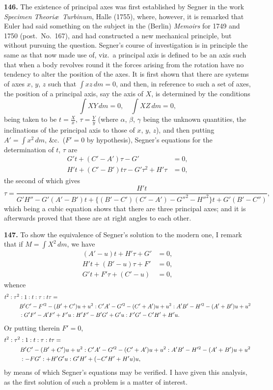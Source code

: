 \documentclass[11pt,a4paper]{book}
\begin{document}
\textbf{146.} The existence of principal axes was first established by Segner in the work \textit{Specimen Theori\ae\ Turbinum}, Halle (1755), where, however, it is remarked that Euler had said something on the subject in the (Berlin) \textit{Memoirs} for 1749 and 1750 (post.\ No.\ 167), and had constructed a new mechanical principle, but without pursuing the question. Segner's course of investigation is in principle the same as that now made use of, viz.\ a principal axis is defined to be an axis such that when a body revolves round it the forces arising from the rotation have no tendency to alter the position of the axes. It is first shown that there are systems of axes $x$, $y$, $z$ such that $\int xz\,dm = 0$, and then, in reference to such a set of axes, the position of a principal axis, say the axis of $X$, is determined by the conditions
\[
\int XY\,dm = 0, \quad \int XZ\,dm = 0,
\]
being taken to be $t = \frac{X}{x}$, $\tau = \frac{Y}{y}$ (where $\alpha$, $\beta$, $\gamma$ being the unknown quantities, the inclinations of the principal axis to those of $x$, $y$, $z$), and then putting $A' = \int x^2\,dm$, \&c.\ ($F' = 0$ by hypothesis), Segner's equations for the determination of $t$, $\tau$ are
\begin{align*}
G't + (C' - A')\tau - G' &= 0, \\
H't + (C' - B')t\tau - G'\tau^2 + H'\tau &= 0,
\end{align*}
the second of which gives
\[
\tau = \frac{H't}{G'H'' - G'(A' - B')t + \{(B' - C')(C' - A') - G''^2 - H''^2\}t + G'(B' - C'')},
\]
which being a cubic equation shows that there are three principal axes; and it is afterwards proved that these are at right angles to each other.

\textbf{147.} To show the equivalence of Segner's solution to the modern one, I remark that if $M = \int X^2\,dm$, we have
\begin{align*}
(A' - u)t + H'\tau + G' &= 0, \\
H't + (B' - u)\tau + F' &= 0, \\
G't + F'\tau + (C' - u) &= 0,
\end{align*}
whence
\begin{align*}
t^2 : \tau^2 : 1 : t : \tau : t\tau &= \\
&\hspace{-2cm} B'C' - F'^2 - (B' + C')u + u^2 : C'A' - G'^2 - (C' + A')u + u^2 : A'B' - H'^2 - (A' + B')u + u^2 \\
&\hspace{-2cm} : G'F' - A'F' + F'u : H'F' - B'G' + G'u : F'G' - C'H' + H'u.
\end{align*}
Or putting therein $F' = 0$,
\begin{align*}
t^2 : \tau^2 : 1 : t : \tau : t\tau &= \\
&\hspace{-2cm} B'C' - (B' + C')u + u^2 : C'A' - G'^2 - (C' + A')u + u^2 : A'B' - H'^2 - (A' + B')u + u^2 \\
&\hspace{-2cm} : -FG' : +H'G'u : G'H' + (-C'H' + H'u)u,
\end{align*}
by means of which Segner's equations may be verified. I have given this analysis, as the first solution of such a problem is a matter of interest.
\end{document}

